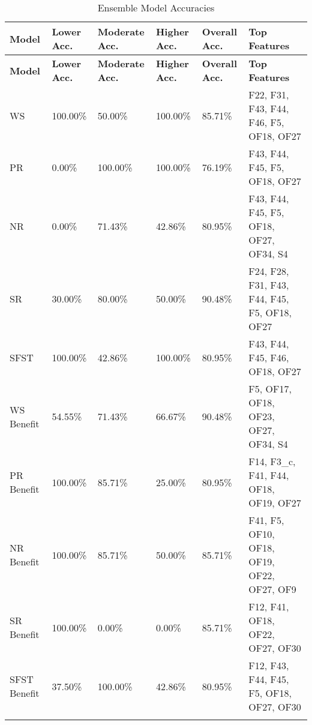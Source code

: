 \begin{longtable}{|p{1.5cm}|p{2.0cm}|p{2.0cm}|p{2.0cm}|p{2.0cm}|p{4cm}|}
\hline
\textbf{Model} & \textbf{Lower Acc.} & \textbf{Moderate Acc.} & \textbf{Higher Acc.} & \textbf{Overall Acc.} & \textbf{Top Features} \\ \hline
\endfirsthead
\hline
\textbf{Model} & \textbf{Lower Acc.} & \textbf{Moderate Acc.} & \textbf{Higher Acc.} & \textbf{Overall Acc.} & \textbf{Top Features} \\ \hline
\endhead

WS & 100.00\% & 50.00\% & 100.00\% & 85.71\% & F22, F31, F43, F44, F46, F5, OF18, OF27 \\ \hline
PR & 0.00\% & 100.00\% & 100.00\% & 76.19\% & F43, F44, F45, F5, OF18, OF27 \\ \hline
NR & 0.00\% & 71.43\% & 42.86\% & 80.95\% & F43, F44, F45, F5, OF18, OF27, OF34, S4 \\ \hline
SR & 30.00\% & 80.00\% & 50.00\% & 90.48\% & F24, F28, F31, F43, F44, F45, F5, OF18, OF27 \\ \hline
SFST & 100.00\% & 42.86\% & 100.00\% & 80.95\% & F43, F44, F45, F46, OF18, OF27 \\ \hline
WS Benefit & 54.55\% & 71.43\% & 66.67\% & 90.48\% & F5, OF17, OF18, OF23, OF27, OF34, S4 \\ \hline
PR Benefit & 100.00\% & 85.71\% & 25.00\% & 80.95\% & F14, F3\_c, F41, F44, OF18, OF19, OF27 \\ \hline
NR Benefit & 100.00\% & 85.71\% & 50.00\% & 85.71\% & F41, F5, OF10, OF18, OF19, OF22, OF27, OF9 \\ \hline
SR Benefit & 100.00\% & 0.00\% & 0.00\% & 85.71\% & F12, F41, OF18, OF22, OF27, OF30 \\ \hline
SFST Benefit & 37.50\% & 100.00\% & 42.86\% & 80.95\% & F12, F43, F44, F45, F5, OF18, OF27, OF30 \\ \hline
\caption{Ensemble Model Accuracies}
\label{tab:grouping_2c}
\end{longtable}

